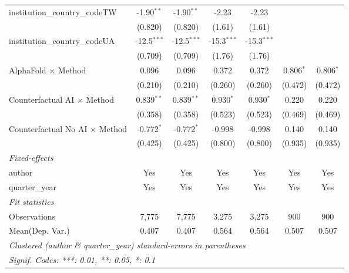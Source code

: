\begin{tabular}{lcccccc}
   institution\_country\_codeTW          & -1.90$^{**}$  & -1.90$^{**}$  & -2.23         & -2.23         &               &   \\   
                                         & (0.820)       & (0.820)       & (1.61)        & (1.61)        &               &   \\   
   institution\_country\_codeUA          & -12.5$^{***}$ & -12.5$^{***}$ & -15.3$^{***}$ & -15.3$^{***}$ &               &   \\   
                                         & (0.709)       & (0.709)       & (1.76)        & (1.76)        &               &   \\   
   AlphaFold $\times$ Method             & 0.096         & 0.096         & 0.372         & 0.372         & 0.806$^{*}$   & 0.806$^{*}$\\   
                                         & (0.210)       & (0.210)       & (0.260)       & (0.260)       & (0.472)       & (0.472)\\   
   Counterfactual AI $\times$ Method     & 0.839$^{**}$  & 0.839$^{**}$  & 0.930$^{*}$   & 0.930$^{*}$   & 0.220         & 0.220\\   
                                         & (0.358)       & (0.358)       & (0.523)       & (0.523)       & (0.469)       & (0.469)\\   
   Counterfactual No AI $\times$ Method  & -0.772$^{*}$  & -0.772$^{*}$  & -0.998        & -0.998        & 0.140         & 0.140\\   
                                         & (0.425)       & (0.425)       & (0.800)       & (0.800)       & (0.935)       & (0.935)\\   
   \midrule
   \emph{Fixed-effects}\\
   author                                & Yes           & Yes           & Yes           & Yes           & Yes           & Yes\\  
   quarter\_year                         & Yes           & Yes           & Yes           & Yes           & Yes           & Yes\\  
   \midrule
   \emph{Fit statistics}\\
   Observations                          & 7,775         & 7,775         & 3,275         & 3,275         & 900           & 900\\  
Mean(Dep. Var.) & 0.407 & 0.407 & 0.564 & 0.564 & 0.507 & 0.507 \\
   \midrule \midrule
   \multicolumn{7}{l}{\emph{Clustered (author \& quarter\_year) standard-errors in parentheses}}\\
   \multicolumn{7}{l}{\emph{Signif. Codes: ***: 0.01, **: 0.05, *: 0.1}}\\
\end{tabular}
\par\endgroup
